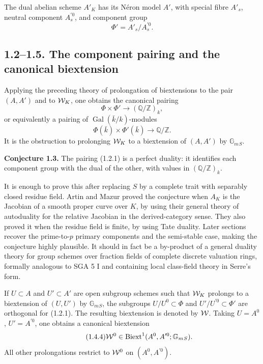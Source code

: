 \documentclass[11pt]{article}
\providecommand{\Gal}{\operatorname{Gal}}
\providecommand{\Z}{\mathbb Z}
\providecommand{\Q}{\mathbb Q}
\providecommand{\Gm}{\mathbb G_m}
\begin{document}
The dual abelian scheme \(A'_K\) has its N\'eron model \(A'\), with special fibre \(A'_s\), neutral component \(A_s^{\prime 0}\), and component group
\begin{equation}\tag{1.1.8}
 \Phi'=A'_s/A_s^{\prime 0}.
\end{equation}

\subsection*{1.2--1.5. The component pairing and the canonical biextension}
Applying the preceding theory of prolongation of biextensions to the pair \((A,A')\) and to \(\mathcal W_K\), one obtains the canonical pairing
\begin{equation}\tag{1.2.1}
 \Phi\times\Phi'\longrightarrow (\Q/\Z)_k,
\end{equation}
or equivalently a pairing of \(\Gal(\bar k/k)\)-modules
\begin{equation}\tag{1.2.2}
 \Phi(\bar k)\times\Phi'(\bar k)\longrightarrow \Q/\Z.
\end{equation}
It is the obstruction to prolonging \(\mathcal W_K\) to a biextension of \((A,A')\) by \(\Gm{}_S\).

\textbf{Conjecture 1.3.}  The pairing (1.2.1) is a perfect duality: it identifies each component group with the dual of the other, with values in \((\Q/\Z)_k\).

It is enough to prove this after replacing \(S\) by a complete trait with separably closed residue field.  Artin and Mazur proved the conjecture when \(A_K\) is the Jacobian of a smooth proper curve over \(K\), by using their general theory of autoduality for the relative Jacobian in the derived-category sense.  They also proved it when the residue field is finite, by using Tate duality.  Later sections recover the prime-to-\(p\) primary components and the semi-stable case, making the conjecture highly plausible.  It should in fact be a by-product of a general duality theory for group schemes over fraction fields of complete discrete valuation rings, formally analogous to SGA 5 I and containing local class-field theory in Serre's form.

If \(U\subset A\) and \(U'\subset A'\) are open subgroup schemes such that \(\mathcal W_K\) prolongs to a biextension of \((U,U')\) by \(\Gm{}_S\), the subgroups \(U/U^0\subset\Phi\) and \(U'/U^{\prime 0}\subset\Phi'\) are orthogonal for (1.2.1).  The resulting biextension is denoted by \(\mathcal W\).  Taking \(U=A^0\), \(U'=A^{\prime 0}\), one obtains a canonical biextension
\begin{equation}\tag{1.4.4}
 \cW^0\in\Biext^1(A^0,A^{\prime 0};\Gm{}_S).
\end{equation}
All other prolongations restrict to \(\mathcal W^0\) on \((A^0,A^{\prime 0})\).
\end{document}
